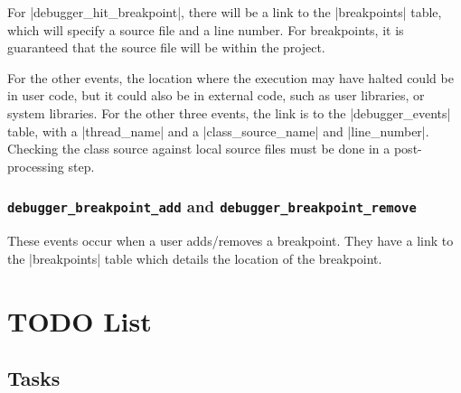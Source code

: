 \documentclass{book}
\begin{document}
For |debugger_hit_breakpoint|, there will be a link to the |breakpoints|
table, which will specify a source file and a line number.  For breakpoints,
it is guaranteed that the source file will be within the project.

For the other events, the location where the execution may have halted could
be in user code, but it could also be in external code, such as user
libraries, or system libraries.  For the other three events, the link is to
the |debugger_events| table, with a |thread_name| and a |class_source_name|
and |line_number|.  Checking the class source against local source files must
be done in a post-processing step.

\subsection{\lstinline|debugger_breakpoint_add| and
  \lstinline|debugger_breakpoint_remove|}

These events occur when a user adds/removes a breakpoint.  They have a link to
the |breakpoints| table which details the location of the breakpoint.

\chapter{TODO List}

\section{Tasks}
\end{document}
